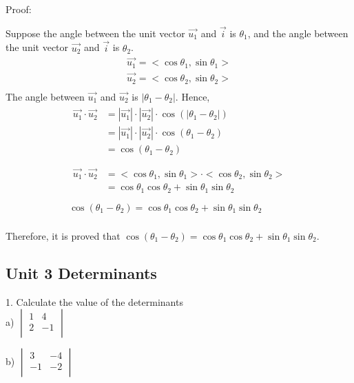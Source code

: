\documentclass{article}
\begin{document}
Proof:

Suppose the angle between the unit vector $\vec{u_1}$ and $\vec{i}$ is 
$\theta_1$, and the angle between the unit vector $\vec{u_2}$ and $\vec{i}$ is 
$\theta_2$.
\begin{gather*}
  \vec{u_1} = <\cos\theta_1, \sin\theta_1> \\
  \vec{u_2} = <\cos\theta_2, \sin\theta_2> \\
\end{gather*}
The angle between $\vec{u_1}$ and $\vec{u_2}$ is $|\theta_1 - \theta_2|$. Hence,
\begin{gather*}
  \begin{split}
    \vec{u_1} \cdot \vec{u_2} &= |\vec{u_1}| \cdot |\vec{u_2}| \cdot \cos(|\theta_1 - \theta_2|) \\
                              &= |\vec{u_1}| \cdot |\vec{u_2}| \cdot \cos(\theta_1 - \theta_2) \\
                              &= \cos(\theta_1 - \theta_2) \\
  \end{split} \\
  \begin{split}
    \vec{u_1} \cdot \vec{u_2} &= <\cos\theta_1, \sin\theta_1> \cdot <\cos\theta_2, \sin\theta_2> \\
                              &= \cos\theta_1\cos\theta_2 + \sin\theta_1\sin\theta_2 \\
  \end{split} \\
  \cos(\theta_1 - \theta_2) = \cos\theta_1\cos\theta_2 + \sin\theta_1\sin\theta_2 \\
\end{gather*}

Therefore, it is proved that 
$\cos(\theta_1 - \theta_2) = \cos\theta_1\cos\theta_2 + \sin\theta_1\sin\theta_2$.

\subsection*{Unit 3 Determinants}

1. Calculate the value of the determinants\\
a) $\begin{vmatrix}
    1 & 4 \\
    2 & -1 \\
\end{vmatrix}$

b) $\begin{vmatrix}
    3 & -4 \\
    -1 & -2 \\
\end{vmatrix}$
\end{document}
